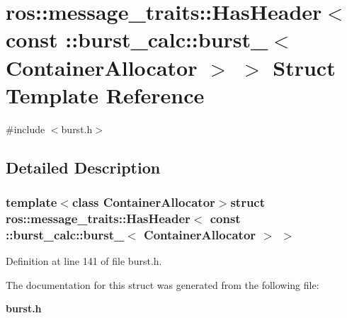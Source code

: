 \section{ros\-:\-:message\-\_\-traits\-:\-:\-Has\-Header$<$ const \-:\-:burst\-\_\-calc\-:\-:burst\-\_\-$<$ \-Container\-Allocator $>$ $>$ \-Struct \-Template \-Reference}
\label{structros_1_1message__traits_1_1HasHeader_3_01const_01_1_1burst__calc_1_1burst___3_01ContainerAllocator_01_4_01_4}


{\ttfamily \#include $<$burst.\-h$>$}



\subsection{\-Detailed \-Description}
\subsubsection*{template$<$class Container\-Allocator$>$struct ros\-::message\-\_\-traits\-::\-Has\-Header$<$ const \-::burst\-\_\-calc\-::burst\-\_\-$<$ Container\-Allocator $>$ $>$}



\-Definition at line 141 of file burst.\-h.



\-The documentation for this struct was generated from the following file\-:\begin{DoxyCompactItemize}
\item 
{\bf burst.\-h}\end{DoxyCompactItemize}
